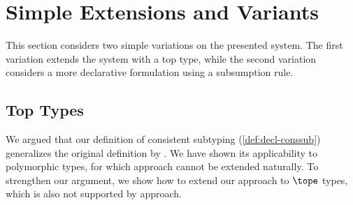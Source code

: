 
\section{Simple Extensions and Variants}
\label{sec:discussion}

This section considers two simple variations on the presented system.
The first variation extends the system with a top type, while the
second variation considers a more declarative formulation using a
subsumption rule.


\subsection{Top Types}
\label{subsec:extension-top}

We argued that our definition of consistent subtyping (\cref{def:decl-conssub})
generalizes the original definition by \citet{siek2007gradual}.
We have shown its applicability to polymorphic types, for which 
\citet{siek2007gradual} approach cannot
be extended naturally. To strengthen our argument,
we show how to extend our approach to $\tope$ types, which 
is also not supported by \citet{siek2007gradual} approach. 




